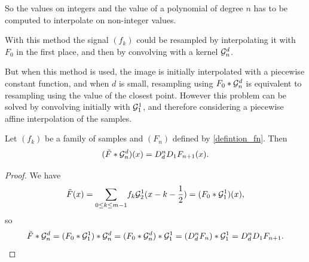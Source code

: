 

\noindent So the values on integers and the value of a polynomial of degree $n$ has to be computed to interpolate on non-integer values.

\medbreak
With this method the signal $(f_k)$ could be resampled by interpolating it with $F_{0}$ in the first place, and then by convolving with a kernel $\mathcal{G}_n^d$.

\noindent But when this method is used, the image is initially interpolated with a piecewise constant function, and when $d$ is small, resampling using $F_{0}*\mathcal{G}_n^d$ is equivalent to resampling using the value of the closest point. However this problem can be solved by convolving initially with $\mathcal{G}_1^1$, and therefore considering a piecewise affine interpolation of the samples.




\begin{prop}
Let $(f_k)$ be a family of samples and $(F_n)$ defined by \eqref{defintion_fn}. Then
\begin{equation*}
( \tilde{F} * \mathcal{G}_n^d ) (x) = D_d^{n}D_1 F_{n+1}(x).
\end{equation*}
\end{prop}

\begin{proof}
We have
\begin{equation*}
\tilde{F}(x)=\displaystyle{\sum_{0\le k \le m-1}} f_k \mathcal{G}_2^1 (x-k-\frac{1}{2})=(F_{0} *\mathcal{G}_1^1 )(x),
\end{equation*}
so
\begin{equation*}
\tilde{F}*\mathcal{G}_n^d=(F_{0}*\mathcal{G}_1^1)*\mathcal{G}_n^d=(F_{0}*\mathcal{G}_n^d)*\mathcal{G}_1^1=(D_d^n F_{n})*\mathcal{G}_1^1= D_d^n D_1 F_{n+1}.
\end{equation*}
\end{proof}


